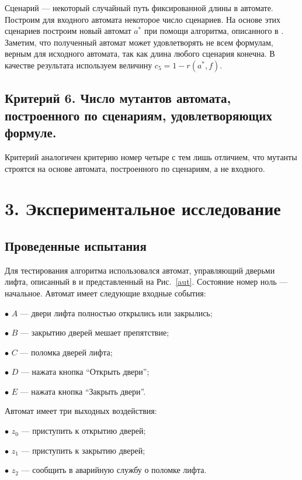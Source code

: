 \documentclass[12pt,fleqn]{article}
\begin{document}
Сценарий --- некоторый случайный путь фиксированной длины в автомате. Построим для входного автомата некоторое
число сценариев. На основе этих сценариев построим новый автомат $a^*$ при помощи алгоритма, описанного в \cite{eg}.
Заметим, что полученный автомат может удовлетворять не всем формулам, верным для исходного автомата, так как
длина любого сценария конечна. В качестве результата используем величину $c_5 = 1 - r(a^*, f)$.

\subsection{Критерий 6. Число мутантов автомата, построенного по сценариям, удовлетворяющих формуле.}

Критерий аналогичен критерию номер четыре с тем лишь отличием, что мутанты строятся на основе автомата, построенного по
сценариям, а не входного.

\section{3. Экспериментальное исследование}

\subsection{Проведенные испытания}

Для тестирования алгоритма использовался автомат, управляющий дверьми лифта, описанный в \cite[Sec 2.3.1]{eg}
и представленный на Рис.~\ref{aut}. Состояние номер ноль --- начальное. Автомат имеет следующие входные события:

$\bullet$ $A$ --- двери лифта полностью открылись или закрылись;

$\bullet$ $B$ --- закрытию дверей мешает препятствие;

$\bullet$ $C$ --- поломка дверей лифта;

$\bullet$ $D$ --- нажата кнопка ``Открыть двери'';

$\bullet$ $E$ --- нажата кнопка ``Закрыть двери''.

Автомат имеет три выходных воздействия:

$\bullet$ $z_0$ --- приступить к открытию дверей;

$\bullet$ $z_1$ --- приступить к закрытию дверей;

$\bullet$ $z_2$ --- сообщить в аварийную службу о поломке лифта.
\end{document}
